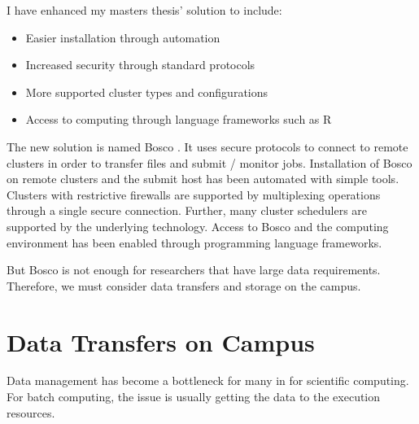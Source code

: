 I have enhanced my masters thesis' solution to include:
\begin{itemize}
\item Easier installation through automation
\item Increased security through standard protocols
\item More supported cluster types and configurations
\item Access to computing through language frameworks such as R \cite{team2005r}
\end{itemize}

The new solution is named Bosco \cite{chep2013weitzel}.  It uses secure protocols to connect to remote clusters in order to transfer files and submit / monitor jobs.  Installation of Bosco on remote clusters and the submit host has been automated with simple tools.  Clusters with restrictive firewalls are supported by multiplexing operations through a single secure connection.  Further, many cluster schedulers are supported by the underlying technology.  Access to Bosco and the computing environment has been enabled through programming language frameworks.

But Bosco is not enough for researchers that have large data requirements.  Therefore, we must consider data transfers and storage on the campus.










\section{Data Transfers on Campus}

Data management has become a bottleneck for many in for scientific computing.  For batch computing, the issue is usually getting the data to the execution resources.  

